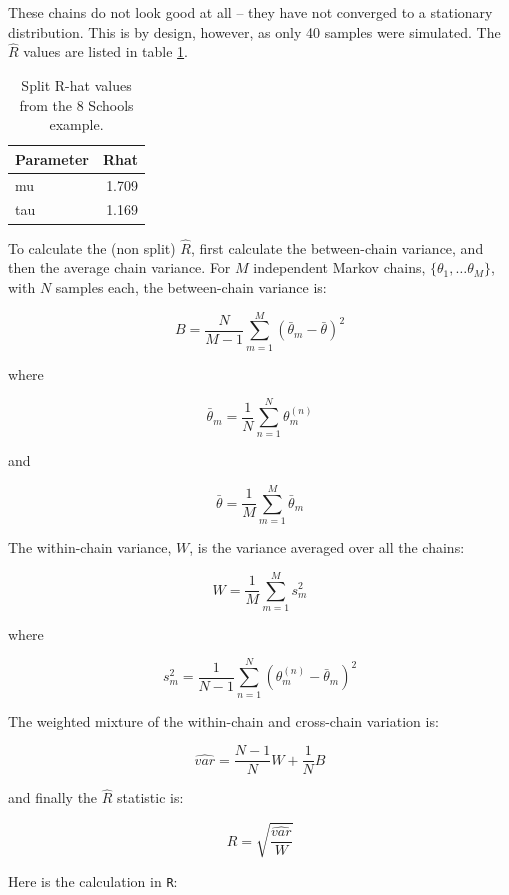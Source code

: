 \documentclass[11pt, oneside, openany]{scrbook}
\begin{document}
These chains do not look good at all -- they have not converged to a stationary distribution. This is by design, however, as only 40 samples were simulated. The \(\hat{R}\) values are listed in table \ref{tab:ch030-Ninth-Finger}.

\begin{table}[!h]

\caption{\label{tab:ch030-Ninth-Finger}Split R-hat values from the 8 Schools example.}
\centering
\begin{tabular}[t]{lr}
\toprule
Parameter & Rhat\\
\midrule
mu & 1.709\\
tau & 1.169\\
\bottomrule
\end{tabular}
\end{table}

To calculate the (non split) \(\hat{R}\), first calculate the between-chain variance, and then the average chain variance. For \(M\) independent Markov chains, \(\{\theta_1, \ldots \theta_M\}\), with \(N\) samples each, the between-chain variance is:


\[
B = \frac{N}{M-1}\sum_{m=1}^{M}\left(\bar{\theta}_m - \bar{\theta}\right)^2
\]

where

\[
\bar{\theta}_m = \frac{1}{N}\sum_{n=1}^{N}\theta_{m}^{(n)}
\]

and

\[
\bar{\theta} = \frac{1}{M}\sum_{m=1}^{M}\bar{\theta}_m
\]

The within-chain variance, \(W\), is the variance averaged over all the chains:

\[
W = \frac{1}{M}\sum_{m=1}^{M} s_{m}^2
\]

where

\[
s_{m}^2 = \frac{1}{N-1}\sum_{n=1}^{N}\left(\theta_{m}^{(n)} - \bar{\theta}_m\right)^2
\]

The weighted mixture of the within-chain and cross-chain variation is:


\[
\hat{var} = \frac{N-1}{N} W + \frac{1}{N} B
\]

and finally the \(\hat{R}\) statistic is:

\[
\hat{R} = \sqrt{\frac{\hat{var}}{W}}
\]

Here is the calculation in \texttt{R}:
\end{document}
